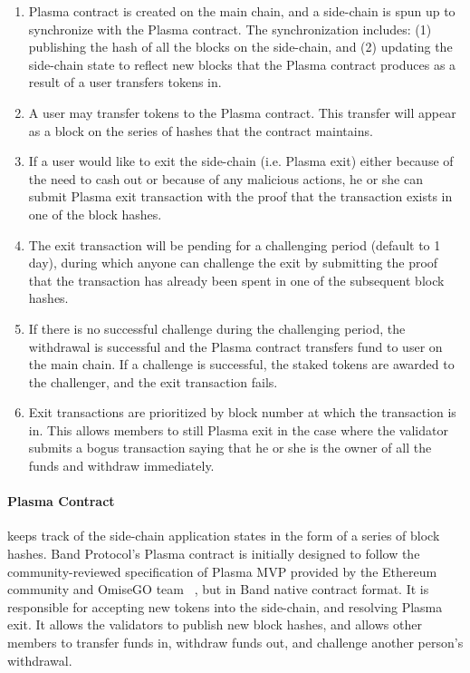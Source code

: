 \documentclass[letterpaper,11pt]{article}
\begin{document}
\begin{enumerate}
\setlength\itemsep{0em}
\item Plasma contract is created on the main chain, and a side-chain is spun up to synchronize with the Plasma contract. The synchronization includes: (1) publishing the hash of all the blocks on the side-chain, and (2) updating the side-chain state to reflect new blocks that the Plasma contract produces as a result of a user transfers tokens in.
\item A user may transfer tokens to the Plasma contract. This transfer will appear as a block on the series of hashes that the contract maintains.
\item If a user would like to exit the side-chain (i.e. Plasma exit) either because of the need to cash out or because of any malicious actions, he or she can submit Plasma exit transaction with the proof that the transaction exists in one of the block hashes.
\item The exit transaction will be pending for a challenging period (default to 1 day), during which anyone can challenge the exit by submitting the proof that the transaction has already been spent in one of the subsequent block hashes.
\item If there is no successful challenge during the challenging period, the withdrawal is successful and the Plasma contract transfers fund to user on the main chain. If a challenge is successful, the staked tokens are awarded to the challenger, and the exit transaction fails.
\item Exit transactions are prioritized by block number at which the transaction is in. This allows members to still Plasma exit in the case where the validator submits a bogus transaction saying that he or she is the owner of all the funds and withdraw immediately.
\end{enumerate}

\paragraph{Plasma Contract} keeps track of the side-chain application states in the form of a series of block hashes. Band Protocol's Plasma contract is initially designed to follow the community-reviewed specification of Plasma MVP provided by the Ethereum community and OmiseGO team~\cite{plasmamvp1,plasmamvp2} , but in Band native contract format. It is responsible for accepting new tokens into the side-chain, and resolving Plasma exit. It allows the validators to publish new block hashes, and allows other members to transfer funds in, withdraw funds out, and challenge another person’s withdrawal. 
\end{document}
